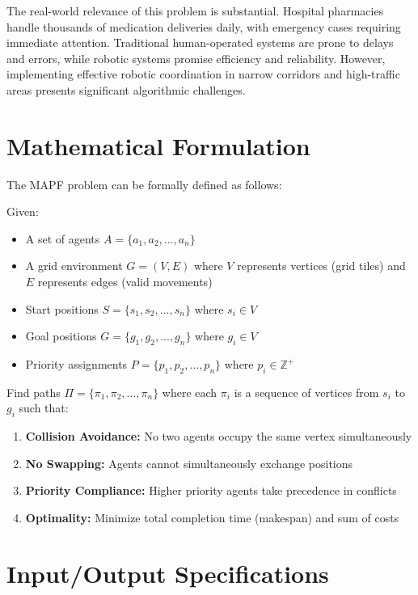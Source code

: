 \documentclass[12pt, a4paper]{report}
\begin{document}
The real-world relevance of this problem is substantial. Hospital pharmacies handle thousands of medication deliveries daily, with emergency cases requiring immediate attention. Traditional human-operated systems are prone to delays and errors, while robotic systems promise efficiency and reliability. However, implementing effective robotic coordination in narrow corridors and high-traffic areas presents significant algorithmic challenges.

\section{Mathematical Formulation}

The MAPF problem can be formally defined as follows:

Given:
\begin{itemize}
    \item A set of agents $A = \{a_1, a_2, ..., a_n\}$
    \item A grid environment $G = (V, E)$ where $V$ represents vertices (grid tiles) and $E$ represents edges (valid movements)
    \item Start positions $S = \{s_1, s_2, ..., s_n\}$ where $s_i \in V$
    \item Goal positions $G = \{g_1, g_2, ..., g_n\}$ where $g_i \in V$
    \item Priority assignments $P = \{p_1, p_2, ..., p_n\}$ where $p_i \in \mathbb{Z}^+$
\end{itemize}

Find paths $\Pi = \{\pi_1, \pi_2, ..., \pi_n\}$ where each $\pi_i$ is a sequence of vertices from $s_i$ to $g_i$ such that:
\begin{enumerate}
    \item \textbf{Collision Avoidance:} No two agents occupy the same vertex simultaneously
    \item \textbf{No Swapping:} Agents cannot simultaneously exchange positions
    \item \textbf{Priority Compliance:} Higher priority agents take precedence in conflicts
    \item \textbf{Optimality:} Minimize total completion time (makespan) and sum of costs
\end{enumerate}

\section{Input/Output Specifications}
\end{document}
